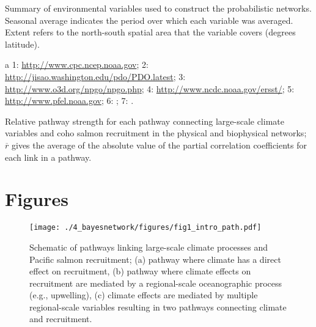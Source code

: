 \begin{table}[!ht]
  \small \centering \libertineLF
  \caption[Summary of environmental variables used to construct the
           probabilistic networks.]{Summary of environmental variables used to
           construct the probabilistic networks. Seasonal average indicates
           the period over which each variable was averaged. Extent refers to
           the north-south spatial area that the variable covers (degrees
           latitude).}
  \begin{threeparttable}
    
    \begin{tablenotes}
      {\footnotesize
        \item[a] 1: \url{http://www.cpc.ncep.noaa.gov}; 
                 2: \url{http://jisao.washington.edu/pdo/PDO.latest}; 
                 3: \url{http://www.o3d.org/npgo/npgo.php}; 
                 4: \url{http://www.ncdc.noaa.gov/ersst/}; 
                 5: \url{http://www.pfel.noaa.gov}; 
                 6: \citet{Peterson2012a}; 
                 7: \citet{PFMC2013}.
        }
    \end{tablenotes}
  \end{threeparttable}
  \label{tab:bn:1}
\end{table}

\newpage
\begin{table}[!ht]
  \small \centering \libertineLF
  \caption[Relative pathway strength for each pathway connecting large-scale
           climate variables and coho salmon recruitment.]{Relative pathway
           strength for each pathway connecting large-scale climate variables
           and coho salmon recruitment in the physical and biophysical networks;
           $\overline{r}$ gives the average of the absolute value of the partial
           correlation coefficients for each link in a pathway.}
  
  \label{tab:bn:2}
\end{table}



\section{Figures}

\begin{figure}[htbp]
  \centering \texttt{[image: ./4\_bayesnetwork/figures/fig1\_intro\_path.pdf]}
  \caption[Schematic of pathways linking large-scale climate processes and
           Pacific salmon recruitment.]{Schematic of pathways linking
           large-scale climate processes and Pacific salmon recruitment; (a)
           pathway where climate has a direct effect on recruitment, (b) pathway
           where climate effects on recruitment are mediated by a regional-scale
           oceanographic process (e.g., upwelling), (c) climate effects are
           mediated by multiple regional-scale variables resulting in two
           pathways connecting climate and recruitment.}
  \label{fig:bn:1}
\end{figure}

